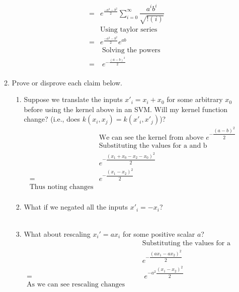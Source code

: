\begin{enumerate}
\begin{enumerate}
\begin{align*}
	=& e^{\frac{-a^2 - b^2}{2}}   \sum \limits_{i=0}^{\infty} \dfrac{a^{i} b^{i}}
                                                                                                          {\sqrt{! (i)}}  \\
	& \text{Using taylor series} \\
	=& e^{\frac{-a^2 - b^2}{2}} e^{ab} \\
	&\;\text{Solving the powers} \\
	=& \; e^{-\frac{(a-b)^2}{2}} \\
\end{align*}

  \item {}  Prove or disprove each claim below.
  
    \begin{enumerate}
    \item Suppose we translate the inputs $x'_i = x_i + x_0$ for some
      arbitrary $x_0$ before using the kernel above in an SVM.  Will my
      kernel function change? (i.e., does $k(x_i,x_j) = k(x'_i,x'_j)$)?
\begin{align*}
	&\text{We can see the kernel from above } e^{-\dfrac{(a-b)^2}{2}} \\
	&\text{Substituting the values for a and b} \\
	& e^{-\dfrac{( x_1 + x_0  - x_2 - x_0)^2}{2}} \\
	=&  e^{-\dfrac{( x_1 - x_2 )^2}{2}} \\
	\text{Thus noting changes}\\
\end{align*}
     
    \item What if we negated all the inputs $x'_i = -x_i$? \\
     \\
    \item What about rescaling $x_i' = ax_i$ for some positive scalar $a$?
\begin{align*}
		&\text{Substituting the values for a and b } \\
		& e^{-\dfrac{( a x_1 - a x_2 )^2}{2}} \\
		=& \; e^{- a^2 \dfrac{( x_1 -  x_2 )^2}{2}} \\
		\text{As we can see rescaling changes the kernel} \\
\end{align*}
      
      
    \end{enumerate}  
  \end{enumerate}
\end{enumerate}
  
\PointStats
